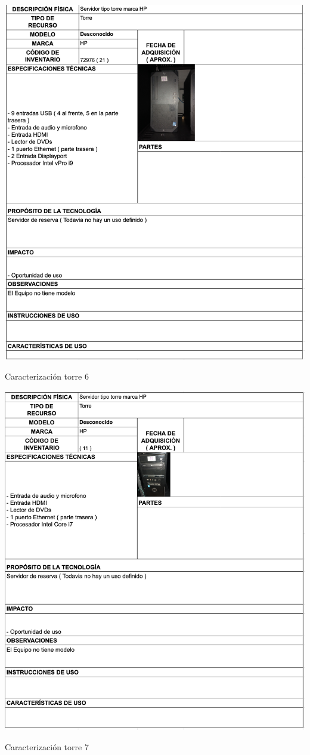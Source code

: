 \begin{table}[H]
    \centering
    \includegraphics[width=\textwidth]{tablas-images/cp1/torres/torre-6.png}
    \caption{Caracterización torre 6}\label{tab:torre-6}
\end{table}

\begin{table}[H]
    \centering
    \includegraphics[width=\textwidth]{tablas-images/cp1/torres/torre-7.png}
    \caption{Caracterización torre 7}\label{tab:torre-7}
\end{table}

